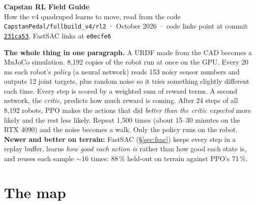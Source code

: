 \documentclass[10pt,letterpaper]{article}
\begin{document}
\begin{center}
{\sffamily\bfseries\LARGE Capstan RL Field Guide}\\[3pt]
{\sffamily How the v4 quadruped learns to move, read from the code}\\[2pt]
{\small\color{Ink2} \texttt{CapstanPedal/fullbuild\_v4/rl2} \;· October 2026 \;·\; code links point at commit \href{https://github.com/soujanya957/capstan-drive-leg/tree/231ca53}{\texttt{231ca53}}, FastSAC links at \texttt{e0ecfe6}}
\end{center}

\begin{note}
\textbf{The whole thing in one paragraph.} A URDF made from the CAD becomes a MuJoCo simulation. 8{,}192 copies of the robot
run at once on the GPU. Every 20\,ms each robot's \emph{policy} (a neural network) reads 153 noisy sensor numbers and outputs
12 joint targets, plus random noise so it tries something slightly different each time. Every step is scored by a weighted sum
of reward terms. A second network, the \emph{critic}, predicts how much reward is coming. After 24 steps of all 8{,}192 robots,
PPO makes the actions that did \emph{better than the critic expected} more likely and the rest less likely. Repeat 1{,}500
times (about 15–30 minutes on the RTX 4090) and the noise becomes a walk. Only the policy runs on the robot.
\textbf{Newer and better on terrain:} FastSAC (§\ref{sec:fsac}) keeps every step in a replay buffer, learns \emph{how good each
action is} rather than how good each state is, and reuses each sample $\sim$16 times: 88\,\% held-out on terrain against PPO's 71\,\%.
\end{note}

\tableofcontents

\section{The map}
\end{document}
